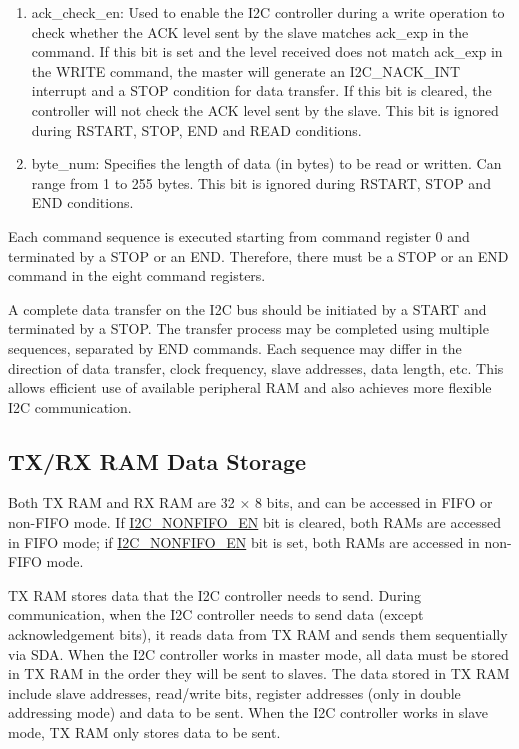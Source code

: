 \documentclass[main\_\_EN.tex]{subfiles}
\begin{document}
\begin{enumerate}
\item ack\_check\_en: Used to enable the I2C controller during a write operation to check whether the ACK level sent by the slave matches ack\_exp in the command. If this bit is set and the level received does not match ack\_exp in the WRITE command, the master will generate an I2C\_NACK\_INT interrupt and a STOP condition for data transfer. If this bit is cleared, the controller will not check the ACK level sent by the slave. This bit is ignored during RSTART, STOP, END and READ conditions.

\item byte\_num: Specifies the length of data (in bytes) to be read or written. Can range from 1 to 255 bytes. This bit is ignored during RSTART, STOP and END conditions.
\end{enumerate}

Each command sequence is executed starting from command register 0 and terminated by a STOP or an END. Therefore, there must be a STOP or an END command in the eight command registers.

A complete data transfer on the I2C bus should be initiated by a START and terminated by a STOP. The transfer process may be completed using multiple sequences, separated by END commands. Each sequence may differ in the direction of data transfer, clock frequency, slave addresses, data length, etc. This allows efficient use of available peripheral RAM and also achieves more flexible I2C communication.

\subsection{TX/RX RAM Data Storage}\label{subsubsec:i2c-txrx}
Both TX RAM and RX RAM are 32 × 8 bits, and can be accessed in FIFO or non-FIFO mode. If \hyperref[fielddesc:I2CNONFIFOEN]{I2C\_NONFIFO\_EN} bit is cleared, both RAMs are accessed in FIFO mode; if \hyperref[fielddesc:I2CNONFIFOEN]{I2C\_NONFIFO\_EN} bit is set, both RAMs are accessed in non-FIFO mode.

TX RAM stores data that the I2C controller needs to send. During communication, when the I2C controller needs to send data (except acknowledgement bits), it reads data from TX RAM and sends them sequentially via SDA. When the I2C controller works in master mode, all data must be stored in TX RAM in the order they will be sent to slaves. The data stored in TX RAM include slave addresses, read/write bits, register addresses (only in double addressing mode) and data to be sent. When the I2C controller works in slave mode, TX RAM only stores data to be sent.
\end{document}
